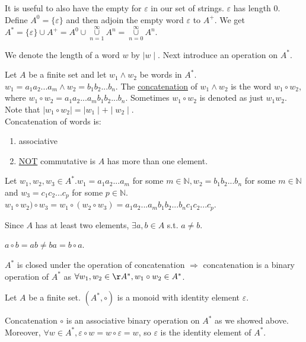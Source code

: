 \documentclass[10pt]{article}
\begin{document}
\begin{description}
\begin{enumerate}
			It is useful to also have the empty for $\varepsilon$ in our set of strings. $\varepsilon$ has length 0. Define $A^0 = \{\varepsilon\}$ and then adjoin the empty word $\varepsilon$ to $A^+$. We get $A^* = \{\varepsilon\} \cup A^+ = A^0 \cup \underset{n=1}{\overset{\infty}{\cup}} A^n = \underset{n=0}{\overset{\infty}{\cup}} A^n$.
		\end{enumerate}
		\item[Notation:] We denote the length of a word $w$ by $\mid w \mid$. Next introduce an operation on $A^*$.
		\item[Definition:] Let $A$ be a finite set and let $w_1 \land w_2$ be words in $A^*$. $w_1 = a_1a_2...a_m \land w_2 = b_1b_2...b_n$. The \underline{concatenation} of $w_1 \land w_2$ is the word $w_1 \circ w_2$, where $w_1 \circ w_2 = a_1a_2...a_mb_1b_2...b_n$. Sometimes $w_1 \circ w_2$ is denoted as just $w_1w_2$. Note that $\mid w_1 \circ w_2 \mid = \mid w_1 \mid + \mid w_2 \mid$. \\
		Concatenation of words is:
		\begin{enumerate}
			\item associative
			\item \underline{NOT} commutative is $A$ has more than one element.
		\end{enumerate}
		\begin{description}
			\item[Proof of (1):] Let $w_1, w_2, w_3 \in A^*. w_1 = a_1a_2...a_m$ for some $m \in \mathbb{N}, w_2=b_1b_2...b_n$ for some $m \in \mathbb{N}$ and $w_3 = c_1c_2...c_p$ for some $p \in \mathbb{N}$. $w_1 \circ w_2) \circ w_3 = w_1 \circ (w_2 \circ w_3) = a_1a_2...a_mb_1b_2...b_nc_1c_2...c_p$.
			\item[qed]
			\item[Proof of (2):] Since $A$ has at least two elements, $\exists a, b \in A$ s.t. $a \neq b$.
			\item $a \circ b = ab \neq ba = b \circ a$.
			\item[qed]
		\end{description}
		\item $A^*$ is closed under the operation of concatenation $\Rightarrow$ concatenation is a binary operation of $A^*$ as $\forall w_1, w_2 \in \AA^*, w_1 \circ w_2 \in A^*$.
		\item[Theorem] Let $A$ be a finite set. $(A^*, \circ)$ is a monoid with identity element $\varepsilon$.
		\item[Proof:] Concatenation $\circ$ is an associative binary operation on $A^*$ as we showed above. Moreover, $\forall w \in A^*, \varepsilon \circ w = w \circ \varepsilon = w$, so $\varepsilon$ is the identity element of $A^*$.

\end{description}
\end{document}
